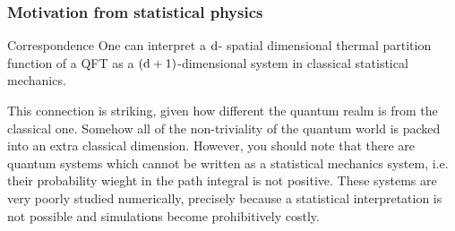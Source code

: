 \subsubsection{Motivation from statistical physics}
\begin{mybox}{Correspondence}
	One can interpret a $\mathrm{d}$- spatial dimensional thermal partition function of a QFT as a $(\mathrm{d}+1)$-dimensional system in classical statistical mechanics.
\end{mybox}
This connection is striking, given how different the quantum realm is from the classical one. Somehow all of the non-triviality of the quantum world is packed into an extra classical dimension. However, you should note that there are quantum systems which cannot be written as a statistical mechanics system, i.e. their probability wieght in the path integral is not positive. These systems are very poorly studied numerically, precisely because a statistical interpretation is not possible and simulations become prohibitively costly.









